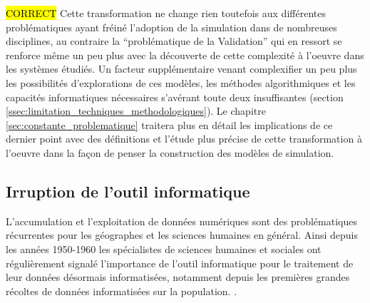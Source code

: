 \hl{CORRECT}
Cette transformation ne change rien toutefois aux différentes problématiques ayant fréiné l'adoption de la simulation dans de nombreuses disciplines, au contraire la \enquote{problématique de la Validation} qui en ressort se renforce même un peu plus avec la découverte de cette complexité à l'oeuvre dans les systèmes étudiés. Un facteur supplémentaire venant complexifier un peu plus les possibilités d'explorations de ces modèles, les méthodes algorithmiques et les capacités informatiques nécessaires s'avérant toute deux insuffisantes (section \ref{ssec:limitation_techniques_methodologiques}). Le chapitre \ref{sec:constante_problematique} traitera plus en détail les implications de ce dernier point avec des définitions et l'étude plus précise de cette transformation à l'oeuvre dans la façon de penser la construction des modèles de simulation.





\subsection{Irruption de l'outil informatique }
\label{sec:apparition_outil_informatique}


L'accumulation et l'exploitation de données numériques sont des problématiques récurrentes pour les géographes et les sciences humaines en général. Ainsi depuis les années 1950-1960 les spécialistes de sciences humaines et sociales ont régulièrement signalé l'importance de l'outil informatique pour le traitement de leur données désormais informatisées, notamment depuis les premières grandes récoltes de données informatisées sur la population. \autocites{Kao1963, Hagerstrand1967b}[386]{Barnes2011}. 

